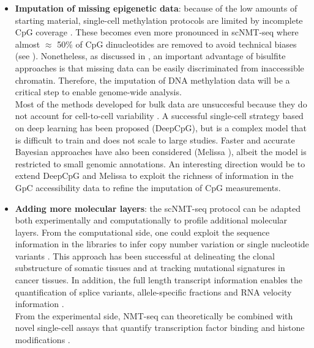 \begin{itemize}
	\item \textbf{Imputation of missing epigenetic data}: because of the low amounts of starting material, single-cell methylation protocols are limited by incomplete CpG coverage \cite{Angermueller2017}. These becomes even more pronounced in scNMT-seq where almost $\approx$ 50\% of CpG dinucleotides are removed to avoid technical biases (see ). Nonetheless, as discussed in , an important advantage of bisulfite approaches is that missing data can be easily discriminated from inaccessible chromatin. Therefore, the imputation of DNA methylation data will be a critical step to enable genome-wide analysis.\\
	Most of the methods developed for bulk data are unsuccesful because they do not account for cell-to-cell variability \cite{Angermueller2017}. A successful single-cell strategy based on deep learning has been proposed (DeepCpG\cite{Angermueller2017}), but is a complex model that is difficult to train and does not scale to large studies. Faster and accurate Bayesian approaches have also been considered (Melissa \cite{Kapourani2018b}), albeit the model is restricted to small genomic annotations. An interesting direction would be to extend DeepCpG and Melissa to exploit the richness of information in the GpC accessibility data to refine the imputation of CpG measurements.

	\item \textbf{Adding more molecular layers}: the scNMT-seq protocol can be adapted both experimentally and computationally to profile additional molecular layers. From the computational side, one could exploit the sequence information in the libraries to infer copy number variation or single nucleotide variants \cite{Poirion2018,Fan2018,McCarthy2018,Enge2017}. This approach has been successful at delineating the clonal substructure of somatic tissues and at tracking mutational signatures in cancer tissues. In addition, the full length transcript information enables the quantification of splice variants\cite{Huang2017}, allele-specific fractions\cite{Deng2014} and RNA velocity information \cite{LaManno2018}.\\
	From the experimental side, NMT-seq can theoretically be combined with novel single-cell assays that quantify transcription factor binding \cite{Moudgil2019} and histone modifications \cite{Kaya-Okur2019}.


\end{itemize}
